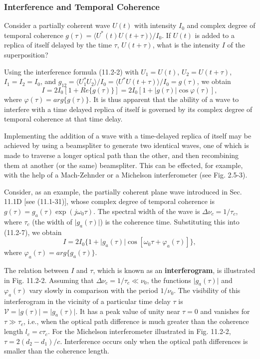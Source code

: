 \documentclass{article}
\numberwithin{figure}{subsection}
\numberwithin{table}{subsection}
\begin{document}
\subsubsection{Interference and Temporal Coherence}
\endgroup
Consider a partially coherent wave $ U(t) $ with intensity $ I_0 $ and complex degree of temporal coherence $ g(\tau) = \langle U^\ast (t) U(t + \tau) \rangle / I_0 $. If $ U(t) $ is added to a replica of itself delayed by the time $ \tau $, $ U(t + \tau) $, what is the intensity $ I $ of the superposition?
\par Using the interference formula (11.2-2) with $ U_1 = U(t) $, $ U_2 = U(t + \tau) $, $ I_1 = I_2 = I_0 $, and $ g_{12} = \langle U_1^\ast U_2 \rangle / I_0 = \langle U^\ast U(t + \tau) \rangle / I_0 = g(\tau) $, we obtain 
\begin{equation}
I = 2 I_0 [1 + Re\{g(\tau)\}] = 2 I_0 [1 + \lvert g(\tau) \rvert \cos \varphi (\tau)],
\end{equation}
where $ \varphi (\tau) = arg\{g(\tau)\}$. It is thus apparent that the ability of a wave to interfere with a time delayed replica of itself is governed by its complex degree of temporal coherence at that time delay.
\par Implementing the addition of a wave with a time-delayed replica of itself may be achieved by using a beamspliter to generate two identical waves, one of which is made to traverse a longer optical path than the other, and then recombining them at another (or the same) beamspliter. This can be effected, for example, with the help of a Mach-Zehnder or a Michelson interferometer (see Fig. 2.5-3).
\par Consider, as an example, the partially coherent plane wave introduced in Sec. 11.1D [see (11.1-31)], whose complex degree of temporal coherence is $ g(\tau) = g_a (\tau) \exp(j\omega_0 \tau) $. The spectral width of the wave is $ \Delta \nu_c = 1 / \tau_c $, where $ \tau_c $ (the width of $ \lvert g_a (\tau) \rvert $) is the coherence time. Substituting this into (11.2-7), we obtain
\begin{equation}
I = 2 I_0 \{1 + \lvert g_a (\tau) \rvert \cos [\omega_0 \tau + \varphi_a (\tau)]\} ,
\end{equation}
where $ \varphi_a (\tau) = arg \{g_a (\tau)\} $.
\par The relation between $ I $ and $ \tau $, which is known as an \textbf{interferogram}, is illustrated in Fig. 11.2-2. Assuming that $ \Delta \nu_c = 1 / \tau_c \ll \nu_0 $, the functions $ \lvert g_a (\tau) \rvert $ and $ \varphi_a (\tau) $ vary slowly in comparison with the period $ 1 / \nu_0 $. The visibility of this interferogram in the vicinity of a particular time delay $ \tau $ is $ \mathcal{V} = \lvert g(\tau) \rvert = \lvert g_a (\tau) \rvert $. It has a peak value of unity near $ \tau = 0 $ and vanishes for $ \tau \gg \tau_c $, i.e., when the optical path difference is much greater than the coherence length $ l_c = c\tau_c $. For the Michelson interferometer illustrated in Fig. 11.2-2, $\tau = 2(d_2 - d_1) / c $. Interference occurs only when the optical path differences is smaller than the coherence length.
\end{document}
